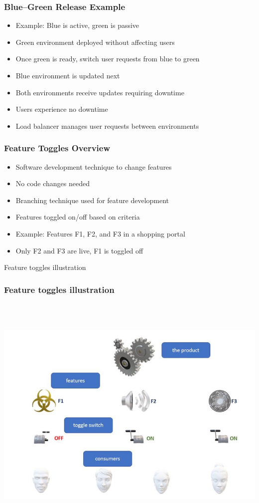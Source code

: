 \documentclass[aspectratio=169, table]{beamer}
\begin{document}
\begin{frame}
	\frametitle{Blue–Green Release Example}
	\begin{itemize}
		\item Example: Blue is active, green is passive
		\item Green environment deployed without affecting users
		\item Once green is ready, switch user requests from blue to green
		\item Blue environment is updated next
		\item Both environments receive updates requiring downtime
		\item Users experience no downtime
		\item Load balancer manages user requests between environments
	\end{itemize}
\end{frame}

\begin{frame}
	\frametitle{Feature Toggles Overview}
	\begin{itemize}
		\item Software development technique to change features
		\item No code changes needed
		\item Branching technique used for feature development
		\item Features toggled on/off based on criteria
		\item Example: Features F1, F2, and F3 in a shopping portal
		\item Only F2 and F3 are live, F1 is toggled off
	\end{itemize}
\end{frame}

\begin{frame}{Feature toggles illustration} 	 \frametitle{Feature toggles illustration} \begin{center} 	\includegraphics[width=0.6\linewidth]{images/image-04.png} \end{center} \end{frame}
\end{document}

